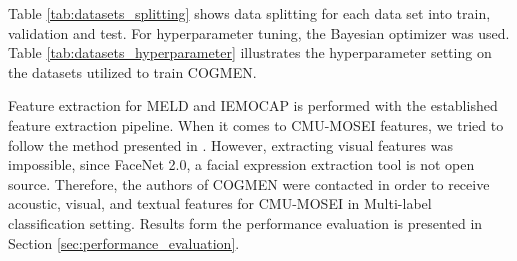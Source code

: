 Table \ref{tab:datasets_splitting} shows data splitting for each data set into train, validation and test. For hyperparameter tuning, the Bayesian optimizer was used. Table \ref{tab:datasets_hyperparameter} illustrates the hyperparameter setting on the datasets utilized to train COGMEN. 
%
\begin{table}[h]
\caption{Data splitting.}
\centering
{}
\label{tab:datasets_splitting}
\end{table}
%
%
\begin{table}[h]
\caption{Hyperparameter settings for each dataset. \textit{ILR} denotes initial learning rate.}
\centering
{}
\label{tab:datasets_hyperparameter}
\end{table}
%
Feature extraction for MELD and IEMOCAP is performed with the established feature extraction pipeline. When it comes to CMU-MOSEI features, we tried to follow the method presented in \cite{cmu-mosei_zadeh2018multimodal}. However, extracting visual features was impossible, since FaceNet 2.0, a facial expression extraction tool is not open source. Therefore, the authors of COGMEN were contacted in order to receive acoustic, visual, and textual features for CMU-MOSEI in Multi-label classification setting. Results form the performance evaluation is presented in Section \ref{sec:performance_evaluation}.

